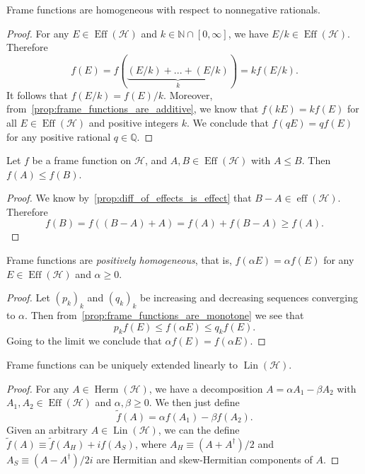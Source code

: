 \documentclass[12pt]{report}
\newcommand{\NN}{\mathbb{N}}
\newcommand{\QQ}{\mathbb{Q}}
\newcommand{\on}[1]{\operatorname{#1}}
\newcommand{\calH}{{\mathcal{H}}}
\DeclareMathOperator{\Herm}{Herm}
\DeclareMathOperator{\Lin}{Lin}
\begin{document}
\begin{prop}
	Frame functions are homogeneous with respect to nonnegative rationals.
\end{prop}
\begin{proof}
	For any $E\in\on{Eff}(\calH)$ and $k\in\NN\cap[0,\infty]$, we have $E/k\in\on{Eff}(\calH)$.
	Therefore
	\begin{equation}
		f(E) = f(\underbrace{(E/k)+...+(E/k)}_k)
		= k f(E/k).
	\end{equation}
	It follows that $f(E/k)=f(E)/k$.
	Moreover, from~\cref{prop:frame_functions_are_additive}, we know that
	$f(kE)=kf(E)$ for all $E\in\on{Eff}(\calH)$ and positive integers $k$.
	We conclude that $f(qE)=qf(E)$ for any positive rational $q\in\QQ$.
\end{proof}


\begin{prop}
	Let $f$ be a frame function on $\calH$, and $A,B\in\on{Eff}(\calH)$ with $A\le B$. Then $f(A)\le f(B)$.
	\label{prop:frame_functions_are_monotone}
\end{prop}
\begin{proof}
	We know by~\cref{prop:diff_of_effects_is_effect} that $B-A\in\on{eff}(\calH)$.
	Therefore
	\begin{equation}
		f(B) = f((B-A)+A) = f(A) + f(B-A) \ge f(A).
	\end{equation}
\end{proof}

\begin{prop}
	Frame functions are \emph{positively homogeneous}, that is, $f(\alpha E)=\alpha f(E)$ for any $E\in\on{Eff}(\calH)$ and $\alpha\ge0$.
\end{prop}
\begin{proof}
	Let $(p_k)_k$ and $(q_k)_k$ be increasing and decreasing sequences converging to $\alpha$. Then from~\cref{prop:frame_functions_are_monotone} we see that
	\begin{equation}
		p_k f(E) \le f(\alpha E) \le q_k f(E).
	\end{equation}
	Going to the limit we conclude that $\alpha f(E)=f(\alpha E)$.
\end{proof}

\begin{prop}
	Frame functions can be uniquely extended linearly to $\Lin(\calH)$.
\end{prop}
\begin{proof}
	For any $A\in\Herm(\calH)$, we have a decomposition $A=\alpha A_1 - \beta A_2$ with $A_1,A_2\in\on{Eff}(\calH)$ and $\alpha,\beta\ge0$.
	We then just define
	\begin{equation}
		\tilde f(A) = \alpha f(A_1) - \beta f(A_2).
	\end{equation}
	Given an arbitrary $A\in\Lin(\calH)$, we can the define $\tilde f(A)\equiv \tilde f(A_H) + i f(A_S)$, where $A_H\equiv (A+A^\dagger)/2$ and $A_S\equiv (A-A^\dagger)/2i$ are Hermitian and skew-Hermitian components of $A$.
\end{proof}
\end{document}
